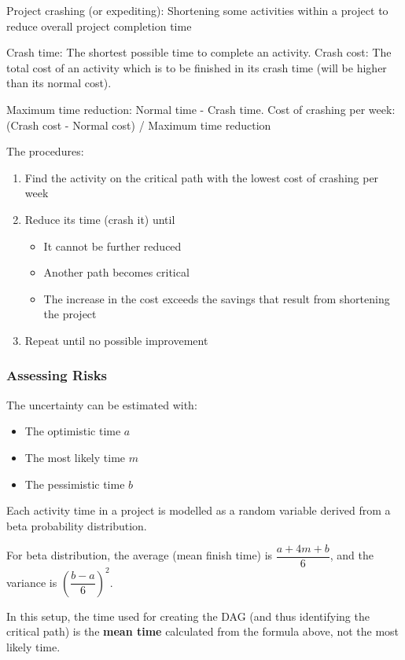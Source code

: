 \documentclass{article}
\newcommand{\red}[1]{\color{red}#1\color{black}\xspace}
\begin{document}
Project crashing (or expediting): Shortening some activities within a project to reduce overall project completion time

Crash time: The shortest possible time to complete an activity.
Crash cost: The total cost of an activity which is to be finished in its crash time (will be higher than its normal cost).

Maximum time reduction: Normal time - Crash time.
Cost of crashing per week: (Crash cost - Normal cost) / Maximum time reduction

The procedures:
\begin{enumerate}
	\item Find the activity \red{on the critical path} with the lowest cost of crashing per week
	\item Reduce its time (crash it) until
	\begin{itemize}
		\item It cannot be further reduced
		\item Another path becomes critical
		\item The increase in the cost exceeds the savings that result from shortening the project
	\end{itemize}
	\item Repeat until no possible improvement
\end{enumerate}


\subsubsection{Assessing Risks}

The uncertainty can be estimated with:
\begin{itemize}
	\item The optimistic time $a$
	\item The most likely time $m$
	\item The pessimistic time $b$
\end{itemize}

Each activity time in a project is modelled as a random variable derived from a beta probability distribution.

For beta distribution, the average (mean finish time) is $\dfrac{a+4m+b}{6}$,
and the variance is $\left(\dfrac{b-a}{6}\right)^2$.

In this setup, the time used for creating the DAG (and thus identifying the critical path) is the \textbf{mean time}
calculated from the formula above, \red{not the most likely time}.
\end{document}
